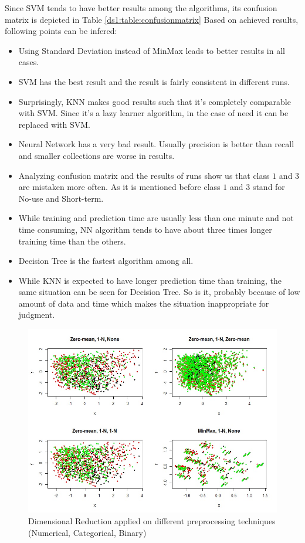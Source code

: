 Since SVM tends to have better results among the algorithms, its confusion matrix is depicted in Table \ref{ds1:table:confusionmatrix}
Based on achieved results, following points can be infered:
\begin{itemize}
\item Using Standard Deviation instead of MinMax leads to better results in all cases.
\item SVM has the best result and the result is fairly consistent in different
runs.
\item Surprisingly, KNN makes good results such that it's completely comparable
with SVM.
Since it's a lazy learner algorithm, in the case of need it can be replaced with SVM.
\item Neural Network has a very bad result. Usually precision is better than recall and smaller collections are worse in results.
\item Analyzing confusion matrix and the results of runs show us that class $1$ and $3$ are mistaken more often. As it is mentioned before class $1$ and $3$ stand for No-use and Short-term.
\item While training and prediction time are usually less than one minute and not time consuming, NN algorithm tends to have about three times longer training time than the others.
\item Decision Tree is the fastest algorithm among all.
\item While KNN is expected to have longer prediction time than training, the
same situation can be seen for Decision Tree. So is it, probably because of
low amount of data and time which makes the situation inappropriate for
judgment.
\end{itemize}

\begin{figure}[p]
\begin{center}
\includegraphics[scale=\figurescaling]{figures/db1/dim_reduction.jpg}
\caption{Dimensional Reduction applied on different preprocessing techniques (Numerical, Categorical, Binary)
\label{ds1:fig:dimred}}
\end{center}
\end{figure}


